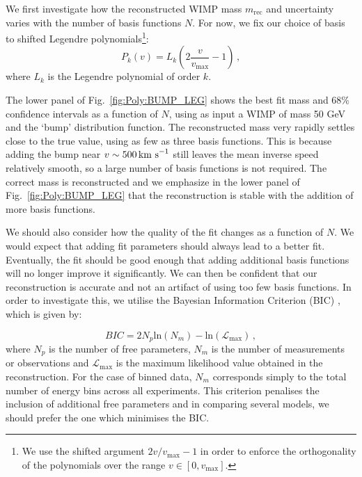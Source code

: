 We first investigate how the reconstructed WIMP mass $m_\textrm{rec}$ and uncertainty varies with the number of basis functions $N$. For now, we fix our choice of basis to shifted Legendre polynomials\footnote{We use the shifted argument $2v/v_\textrm{max} - 1$ in order to enforce the orthogonality of the polynomials over the range $v \in [0, v_\textrm{max}]$.}:
\begin{equation}
P_k(v) = L_k\left(2\frac{v}{v_\textrm{max}} - 1\right)\,,
\end{equation}
where $L_k$ is the Legendre polynomial of order $k$.
 
The lower panel of Fig.~\ref{fig:Poly:BUMP_LEG} shows the best fit mass and 68\% confidence intervals as a function of $N$, using as input a WIMP of mass 50 GeV and the `bump' distribution function. The reconstructed mass very rapidly settles close to the true value, using as few as three basis functions. This is because adding the bump near $v \sim 500 \,\textrm{km s}^{-1}$ still leaves the mean inverse speed relatively smooth, so a large number of basis functions is not required. The correct mass is reconstructed and we emphasize in the lower panel of Fig.~\ref{fig:Poly:BUMP_LEG} that the reconstruction is stable with the addition of more basis functions.

We should also consider how the quality of the fit changes as a function of $N$. We would expect that adding fit parameters should always lead to a better fit. Eventually, the fit should be good enough that adding additional basis functions will no longer improve it significantly. We can then be confident that our reconstruction is accurate and not an artifact of using too few basis functions. In order to investigate this, we utilise the Bayesian Information Criterion (BIC) \cite{Schwarz:1978}, which is given by:

\begin{equation}
BIC = 2N_p\textrm{ln}(N_m) - \textrm{ln}(\mathcal{L}_\textrm{max}) \, ,
\end{equation}
where $N_p$ is the number of free parameters, $N_m$ is the number of measurements or observations and $\mathcal{L}_\textrm{max}$ is the maximum likelihood value obtained in the reconstruction. For the case of binned data, $N_m$ corresponds simply to the total number of energy bins across all experiments. This criterion penalises the inclusion of additional free parameters and in comparing several models, we should prefer the one which minimises the BIC.

